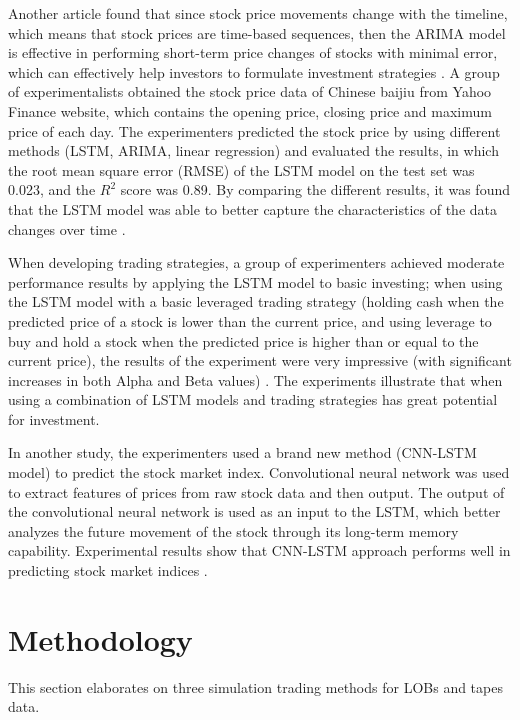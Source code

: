 \documentclass[conference]{IEEEtran}
\begin{document}
Another article found that since stock price movements change with the timeline, which means that stock prices are time-based sequences, then the ARIMA model is effective in performing short-term price changes of stocks with minimal error, which can effectively help investors to formulate investment strategies \cite{b3}. A group of experimentalists obtained the stock price data of Chinese baijiu from Yahoo Finance website, which contains the opening price, closing price and maximum price of each day. The experimenters predicted the stock price by using different methods (LSTM, ARIMA, linear regression) and evaluated the results, in which the root mean square error (RMSE) of the LSTM model on the test set was 0.023, and the $R^2$ score was 0.89. By comparing the different results, it was found that the LSTM model was able to better capture the characteristics of the data changes over time \cite{b4}.

When developing trading strategies, a group of experimenters achieved moderate performance results by applying the LSTM model to basic investing; when using the LSTM model  with a basic leveraged trading strategy (holding cash when the predicted price of a stock is lower than the current price, and using leverage to buy and hold a stock when the predicted price is higher than or equal to the current price), the results of the experiment were very impressive (with significant increases in both Alpha and Beta values) \cite{b12}.  The experiments illustrate that when using a combination of LSTM models and trading strategies has great potential for investment.

In another study, the experimenters used a brand new method (CNN-LSTM model) to predict the stock market index. Convolutional neural network was used to extract features of prices from raw stock data and then output. The output of the convolutional neural network is used as an input to the LSTM, which better analyzes the future movement of the stock through its long-term memory capability. Experimental results show that CNN-LSTM approach performs well in predicting stock market indices \cite{b5}.


\section{Methodology}
This section elaborates on three simulation trading methods for LOBs and tapes data.

\end{document}
